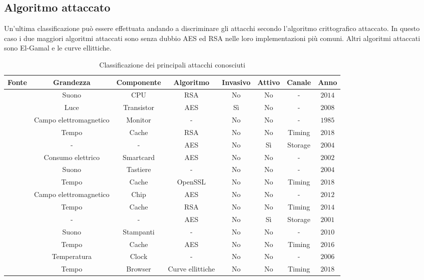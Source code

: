 		\subsection*{Algoritmo attaccato}		
			Un'ultima classificazione può essere effettuata andando a discriminare gli attacchi secondo l'algoritmo crittografico attaccato. In questo caso i due maggiori algoritmi attaccati sono senza dubbio \ac{AES}\cite{standard2001announcing} ed RSA\cite{rivest1978method} nelle loro implementazioni più comuni. Altri algoritmi attaccati sono El-Gamal\cite{elgamal1985public} e le curve ellittiche\cite{koblitz1987elliptic,miller1985use}.
			\begin{table}[]
				\scriptsize
				\centering
				\begin{tabular}{|c|c|c|c|c|c|c|c|} \hline
					Fonte						& Grandezza					& Componente	& Algoritmo			& Invasivo	& Attivo	& Canale	& Anno		\\ \hline \hline
					\cite{genkin2014rsa}		& Suono						& CPU			& RSA				& No		& No		& -			& $2014$	\\ \hline
					\cite{ferrigno2008aes}		& Luce						& Transistor	& AES				& Sì		& No		& -			& $2008$	\\ \hline
					\cite{van1985electromagn}	& Campo elettromagnetico	& Monitor    	& -					& No		& No		& -			& $1985$	\\ \hline
					\cite{kocher2018spectre}	& Tempo						& Cache			& RSA				& No		& No		& Timing	& $2018$	\\ \hline
					\cite{giraud2004dfa}		& -							& -				& AES				& No		& Sì		& Storage	& $2004$	\\ \hline
					\cite{mangard2002simple}	& Consumo elettrico			& Smartcard		& AES				& No		& No		& -			& $2002$	\\ \hline
					\cite{asonov2004keyboard}	& Suono						& Tastiere		& -					& No		& No		& -			& $2004$	\\ \hline
					\cite{zhou2018efficient}	& Tempo						& Cache			& OpenSSL			& No		& No		& Timing	& $2018$	\\ \hline
					\cite{martinasek2012simple}	& Campo elettromagnetico	& Chip			& AES				& No		& No		& -			& $2012$	\\ \hline
					\cite{yarom2014flush+}		& Tempo						& Cache			& RSA				& No		& No		& Timing	& $2014$	\\ \hline
					\cite{karri2001fault}		& -							& -				& AES				& No		& Sì		& Storage	& $2001$	\\ \hline
					\cite{backes2010acoustic}	& Suono						& Stampanti		& -					& No		& No		& -			& $2010$	\\ \hline
					\cite{lipp2016armageddon}	& Tempo						& Cache			& AES				& No		& No		& Timing	& $2016$	\\ \hline
					\cite{murdoch2006hot}		& Temperatura				& Clock			& -					& No		& No		& -			& $2006$	\\ \hline
					\cite{genkin2018drive}		& Tempo						& Browser		& Curve ellittiche	& No		& No		& Timing	& $2018$	\\ \hline
				\end{tabular}
				\caption{Classificazione dei principali attacchi conosciuti}
				\label{tab:attacchi}
			\end{table}
